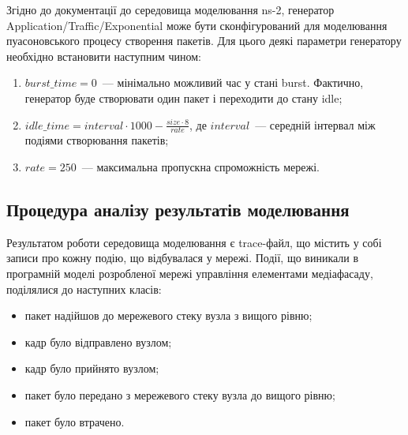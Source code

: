 \documentclass[a4paper,ukrainian,utf8,nocolumnsxix,floatsection,equationsection]{eskdtext}
\begin{document}
Згідно до документації до середовища моделювання ns-2, генератор Application/Traffic/Exponential може бути сконфігурований для моделювання пуасоновського процесу створення пакетів. Для цього деякі параметри генератору необхідно встановити наступним чином:
\begin{enumerate}
	\item $burst\_time = 0$~--- мінімально можливий час у стані burst. Фактично, генератор буде створювати один пакет і переходити до стану idle;
	\item $idle\_time = interval\cdot1000 - \frac{size \cdot 8}{rate}$, де $interval$~--- середній інтервал між подіями створювання пакетів;
	\item $rate = 250$~--- максимальна пропускна спроможність мережі.
\end{enumerate}

\subsection{Процедура аналізу результатів моделювання}

Результатом роботи середовища моделювання є trace-файл, що містить у собі записи про кожну подію, що відбувалася у мережі. Події, що виникали в програмній моделі розробленої мережі управління елементами медіафасаду, поділялися до наступних класів:
\begin{itemize}
	\item пакет надійшов до мережевого стеку вузла з вищого рівню;
	\item кадр було відправлено вузлом;
	\item кадр було прийнято вузлом;
	\item пакет було передано з мережевого стеку вузла до вищого рівню;
	\item пакет було втрачено.
\end{itemize}
\end{document}

